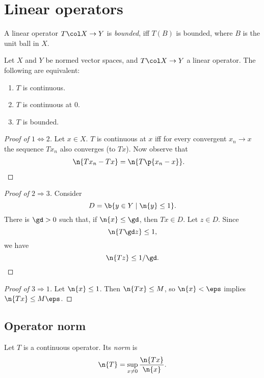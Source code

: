 \section{Linear operators}

\begin{definition}
  A linear operator $T \col X \to Y$ is \emph{bounded}, iff $T(B)$ is bounded, where $B$ is the unit ball in $X$.
\end{definition}

\begin{lemma}
  Let $X$ and $Y$ be normed vector spaces, and $T \col X \to Y$ a linear operator.
  The following are equivalent:
  \begin{enumerate}
    \item $T$ is continuous.
    \item $T$ is continuous at 0.
    \item $T$ is bounded.
  \end{enumerate}
\end{lemma}

\begin{proof}[Proof of $1 \Leftrightarrow 2$]
  Let $x \in X$. $T$ is continuous at $x$ iff for every convergent $x_n \to x$ the sequence $Tx_n$ also converges (to $Tx$).
  Now observe that
  \begin{align*}
    \n{Tx_n-Tx}
    &= \n{T\p{x_n-x}}.
  \end{align*}
\end{proof}

\begin{proof}[Proof of $2 \Rightarrow 3$]
  Consider $$ D = \b{y \in Y \mid \n{y} \le 1}. $$
  There is $\gd > 0$ such that, if $\n{x} \le \gd$, then $Tx \in D$.
  Let $z \in D$.
  Since
  $$\n{T{\gd z}} \le 1,$$ we have
  $$ \n{Tz} \le {1}/{\gd}. $$
\end{proof}

\begin{proof}[Proof of $3 \Rightarrow 1$]
  Let $\n{x} \le 1$. Then $\n{Tx} \le M$, so $\n{x} < \eps$ implies $\n{Tx} \le M \eps$.
\end{proof}

\subsection{Operator norm}

\begin{definition}
  Let $T$ is a continuous operator. Its \emph{norm} is
  $$ \n{T} = \sup_{x \ne 0} \frac{\n{Tx}}{\n{x}}. $$
\end{definition}

